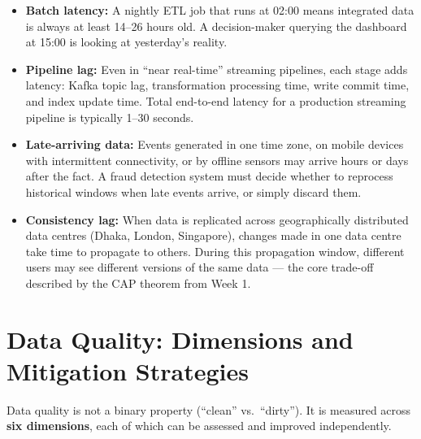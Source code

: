 \documentclass[12pt,a4paper]{article}
\begin{document}
\begin{itemize}[leftmargin=1.8em]
  \item \textbf{Batch latency:} A nightly ETL job that runs at 02:00 means integrated data is always at least 14--26 hours old.  A decision-maker querying the dashboard at 15:00 is looking at yesterday's reality.
  \item \textbf{Pipeline lag:} Even in ``near real-time'' streaming pipelines, each stage adds latency: Kafka topic lag, transformation processing time, write commit time, and index update time.  Total end-to-end latency for a production streaming pipeline is typically 1--30 seconds.
  \item \textbf{Late-arriving data:} Events generated in one time zone, on mobile devices with intermittent connectivity, or by offline sensors may arrive hours or days after the fact.  A fraud detection system must decide whether to reprocess historical windows when late events arrive, or simply discard them.
  \item \textbf{Consistency lag:} When data is replicated across geographically distributed data centres (Dhaka, London, Singapore), changes made in one data centre take time to propagate to others.  During this propagation window, different users may see different versions of the same data --- the core trade-off described by the CAP theorem from Week 1.
\end{itemize}

\section{Data Quality: Dimensions and Mitigation Strategies}

Data quality is not a binary property (``clean'' vs.\ ``dirty'').  It is measured across \textbf{six dimensions}, each of which can be assessed and improved independently.
\end{document}

